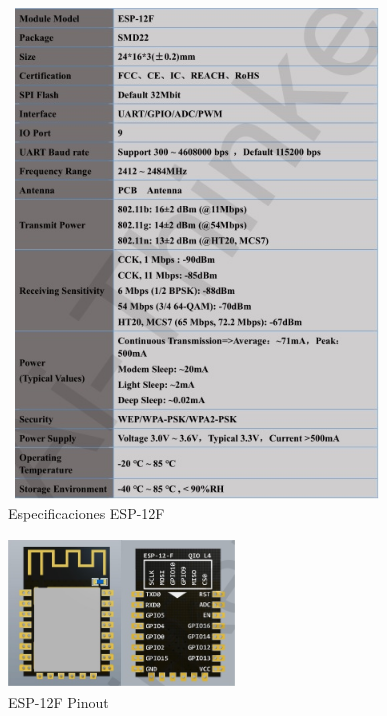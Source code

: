     \begin{figure}[H]
        \centering
        \includegraphics[width=10cm, height=13cm]{imagenes/esp-12F especificaciones.jpg}
        \caption{Especificaciones ESP-12F}
        \label{imag:esp-12F_especificaciones}
    \end{figure}

    
    \begin{figure}[H]
        \centering
        \includegraphics[width=6cm, height=4cm]{imagenes/esp-12F pinout.jpg}
        \caption{ESP-12F Pinout}
        \label{imag:esp-12F_pinout}
    \end{figure}


